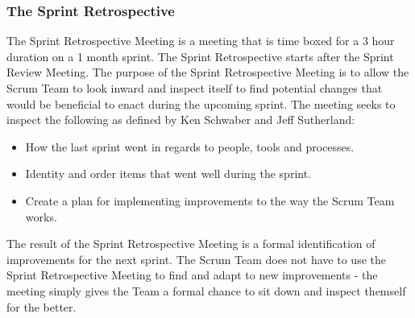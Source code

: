 \subsubsection{The Sprint Retrospective}

The Sprint Retrospective Meeting is a meeting that is time boxed for a 3 hour duration on a 
1 month sprint. The Sprint Retrospective starts after the Sprint Review Meeting.
The purpose of the Sprint Retrospective Meeting is to allow the Scrum Team to look inward 
and inspect itself to find potential changes that would be beneficial to enact during the 
upcoming sprint\cite{scrumguide11}. The meeting seeks to inspect the 
following as defined by Ken Schwaber and Jeff Sutherland:\cite{scrumguide11}

\begin{itemize}
	\item	How the last sprint went in regards to people, tools and processes. 
	\item Identity and order items that went well during the sprint.
	\item	Create a plan for implementing improvements to the way the Scrum Team works.
\end{itemize}


The result of the Sprint Retrospective Meeting is a formal identification of improvements 
for the next sprint\cite{scrumguide11}. The Scrum Team does not have to use the Sprint 
Retrospective Meeting to find and adapt to new improvements - the meeting simply gives the 
Team a formal chance to sit down and inspect themself for the better\cite{scrumguide11}.